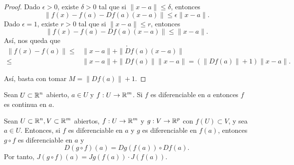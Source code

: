 \begin{proof}
Dado $\displaystyle \epsilon > 0 $, existe $\displaystyle \delta > 0 $ tal que si $\displaystyle \|x-a\| \leq \delta  $, entonces 
\[ \|f\left(x\right)-f\left(a\right)-Df\left(a\right)\left(x-a\right)\|\leq \epsilon \|x-a\| .\]
Dado $\displaystyle \epsilon = 1 $, existe $\displaystyle r > 0 $ tal que si $\displaystyle \|x-a\| \leq r $, entonces 
\[ \|f\left(x\right)-f\left(a\right)-Df\left(a\right)\left(x-a\right)\| \leq  \|x-a\| .\]
Así, nos queda que 
\[ .\]
\[
\begin{split}
	\|f\left(x\right)-f\left(a\right)\| \leq & \|x-a\| + \|Df\left(a\right)\left(x-a\right)\| \\
	\leq & \|x-a\| + \|Df\left(a\right)\| \|x-a\| = \left(\|Df\left(a\right)\| + 1\right) \|x-a\|.
\end{split}
\]

Así, basta con tomar $\displaystyle M = \|Df\left(a\right)\|+1 $.
\end{proof}
\begin{colorary}
Sean $\displaystyle U \subset \mathbb{R}^{n} $ abierto, $\displaystyle a \in U $ y $\displaystyle f : U \to \mathbb{R}^{m} $. Si $\displaystyle f $ es diferenciable en $\displaystyle a $ entonces $\displaystyle f $ es continua en $\displaystyle a $.
\end{colorary}
\begin{theorem}
Sean $\displaystyle U \subset \mathbb{R}^{n}, V \subset \mathbb{R}^{m} $ abiertos, $\displaystyle f : U \to \mathbb{R}^{m} $ y $\displaystyle g : V \to \mathbb{R}^{p} $ con $\displaystyle f\left(U\right) \subset V $, y sea $\displaystyle a \in U $. Entonces, si $\displaystyle f $ es diferenciable en $\displaystyle a $ y $\displaystyle g $ es diferenciable en $\displaystyle f\left(a\right) $, entonces $\displaystyle g \circ f $ es diferenciable en $\displaystyle a $ y 
\[D\left(g\circ f\right)\left(a\right) = Dg\left(f\left(a\right)\right)\circ Df\left(a\right) .\]
Por tanto, $\displaystyle J\left(g\circ f\right)\left(a\right) = Jg\left(f\left(a\right)\right) \cdot J\left(f\left(a\right)\right) $.
\end{theorem}
